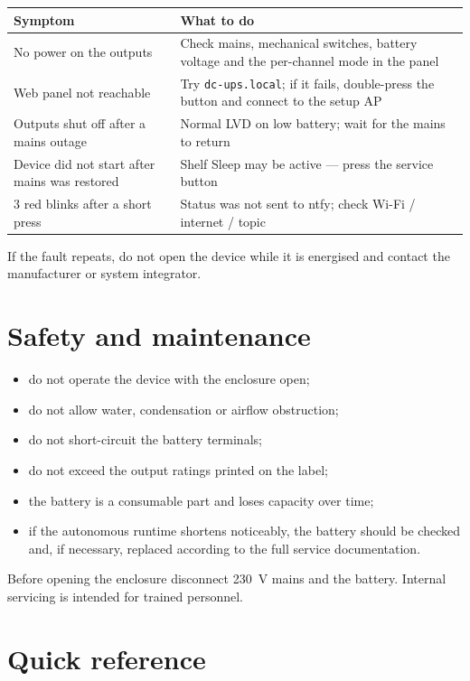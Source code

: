 \documentclass[10.5pt,a5paper]{article}
\begin{document}
\begin{tabularx}{\textwidth}{@{}p{43mm}X@{}}
\toprule
\textbf{Symptom} & \textbf{What to do} \\
\midrule
No power on the outputs & Check mains, mechanical switches, battery voltage and the per-channel mode in the panel \\
Web panel not reachable & Try \texttt{dc-ups.local}; if it fails, double-press the button and connect to the setup AP \\
Outputs shut off after a mains outage & Normal LVD on low battery; wait for the mains to return \\
Device did not start after mains was restored & Shelf Sleep may be active --- press the service button \\
3 red blinks after a short press & Status was not sent to ntfy; check Wi-Fi / internet / topic \\
\bottomrule
\end{tabularx}

If the fault repeats, do not open the device while it is energised and contact the manufacturer or system integrator.

\section{Safety and maintenance}

\begin{itemize}
  \item do not operate the device with the enclosure open;
  \item do not allow water, condensation or airflow obstruction;
  \item do not short-circuit the battery terminals;
  \item do not exceed the output ratings printed on the label;
  \item the battery is a consumable part and loses capacity over time;
  \item if the autonomous runtime shortens noticeably, the battery should be checked and, if necessary, replaced according to the full service documentation.
\end{itemize}

\begin{warnbox}
Before opening the enclosure disconnect 230~V mains and the battery. Internal servicing is intended for trained personnel.
\end{warnbox}

\newpage
\section*{Quick reference}
\end{document}
